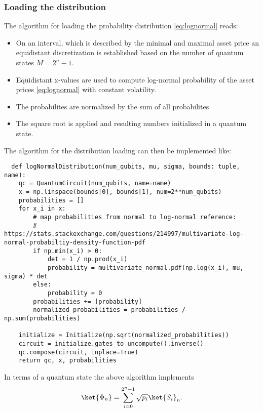 \documentclass[../../main.tex]{subfiles}
\begin{document}
\subsubsection{Loading the distribution}
The algorithm for loading the probability distribution \ref{eq:lognormal} reads:
\begin{itemize}
  \item On an interval, which is described by the minimal and maximal asset price an equidistant discretization is established
   based on the number of quantum states $M=2^n-1$.
  \item Equidistant x-values are used to compute log-normal probability of the asset prices \ref{eq:lognormal} with constant volatility.
  \item The probabilites are normalized by the sum of all probabilites
  \item The square root is applied and resulting numbers initialized in a quantum state.
\end{itemize} 
The algorithm for the distribution loading can then be implemented like:
\begin{lstlisting}
  def logNormalDistribution(num_qubits, mu, sigma, bounds: tuple, name):
    qc = QuantumCircuit(num_qubits, name=name)
    x = np.linspace(bounds[0], bounds[1], num=2**num_qubits)
    probabilities = []
    for x_i in x:
        # map probabilities from normal to log-normal reference:
        # https://stats.stackexchange.com/questions/214997/multivariate-log-normal-probabiltiy-density-function-pdf
        if np.min(x_i) > 0:
            det = 1 / np.prod(x_i)
            probability = multivariate_normal.pdf(np.log(x_i), mu, sigma) * det
        else:
            probability = 0
        probabilities += [probability]
        normalized_probabilities = probabilities / np.sum(probabilities) 
        
    initialize = Initialize(np.sqrt(normalized_probabilities))
    circuit = initialize.gates_to_uncompute().inverse()
    qc.compose(circuit, inplace=True)
    return qc, x, probabilities
\end{lstlisting}
In terms of a quantum state the above algorithm implements
\begin{equation}\label{eq:distLoading}
\ket{{\Phi}_n} = \sum_{i=0}^{2^n-1} \sqrt{p_i} \ket{S_i}_n .
\end{equation}
\end{document}
